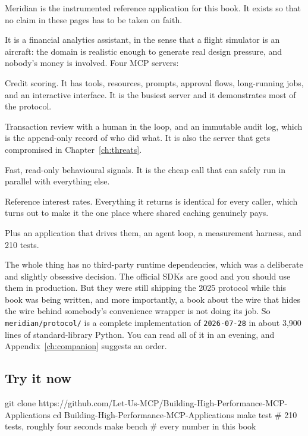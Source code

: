 Meridian is the instrumented reference application for this book. It exists so
that no claim in these pages has to be taken on faith.

It is a financial analytics assistant, in the sense that a flight simulator is an
aircraft: the domain is realistic enough to generate real design pressure, and
nobody's money is involved. Four MCP servers:

\begin{description}[leftmargin=1.4em, style=nextline, itemsep=4pt]
\item[\texttt{meridian-risk}] Credit scoring. It has tools, resources, prompts,
approval flows, long-running jobs, and an interactive interface. It is the
busiest server and it demonstrates most of the protocol.
\item[\texttt{meridian-compliance}] Transaction review with a human in the loop,
and an immutable audit log, which is the append-only record of who did what.
It is also the server that gets compromised in Chapter~\ref{ch:threats}.
\item[\texttt{meridian-fraud}] Fast, read-only behavioural signals. It is the
cheap call that can safely run in parallel with everything else.
\item[\texttt{meridian-marketdata}] Reference interest rates. Everything it
returns is identical for every caller, which turns out to make it the one place
where shared caching genuinely pays.
\end{description}

Plus an application that drives them, an agent loop, a measurement harness, and
210 tests.

The whole thing has no third-party runtime dependencies, which was a deliberate
and slightly obsessive decision. The official SDKs are good and you should use
them in production. But they were still shipping the 2025 protocol while this
book was being written, and more importantly, a book about the wire that hides
the wire behind somebody's convenience wrapper is not doing its job. So
\texttt{meridian/protocol/} is a complete implementation of
\texttt{2026-07-28} in about 3,900 lines of standard-library Python. You can
read all of it in an evening, and Appendix~\ref{ch:companion} suggests an order.

\subsection{Try it now}

\begin{sh}
git clone https://github.com/Let-Us-MCP/Building-High-Performance-MCP-Applications
cd Building-High-Performance-MCP-Applications
make test     # 210 tests, roughly four seconds
make bench    # every number in this book
\end{sh}

